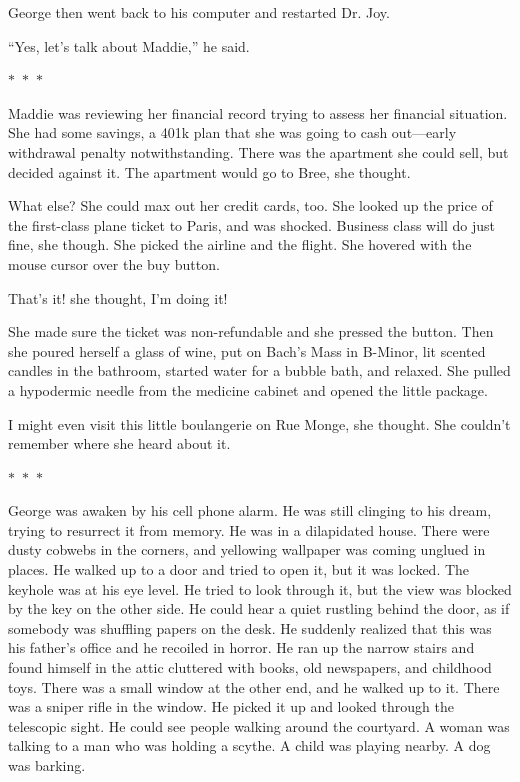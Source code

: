 \documentclass{memoir}
\newcommand{\starbreak}{%
\begin{center}
  $\ast$~$\ast$~$\ast$
\end{center}
}
\begin{document}
George then went back to his computer and restarted Dr. Joy.

``Yes, let's talk about Maddie,'' he said.

\starbreak

Maddie was reviewing her financial record trying to assess her financial situation. She had some savings, a 401k plan that she was going to cash out---early withdrawal penalty notwithstanding. There was the apartment she could sell, but decided against it. The apartment would go to Bree, she thought. 

What else? She could max out her credit cards, too. She looked up the price of the first-class plane ticket to Paris, and was shocked. Business class will do just fine, she though. She picked the airline and the flight. She hovered with the mouse cursor over the buy button. 

That's it! she thought, I'm doing it! 

She made sure the ticket was non-refundable and she pressed the button. Then she poured herself a glass of wine, put on Bach's Mass in B-Minor, lit scented candles in the bathroom, started water for a bubble bath, and relaxed. She pulled a hypodermic needle from the medicine cabinet and opened the little package.

I might even visit this little boulangerie on Rue Monge, she thought. She couldn't remember where she heard about it.

\starbreak

George was awaken by his cell phone alarm. He was still clinging to his dream, trying to resurrect it from memory. He was in a dilapidated house. There were dusty cobwebs in the corners, and yellowing wallpaper was coming unglued in places. He walked up to a door and tried to open it, but it was locked. The keyhole was at his eye level. He tried to look through it, but the view was blocked by the key on the other side. He could hear a quiet rustling behind the door, as if somebody was shuffling papers on the desk. He suddenly realized that this was his father's office and he recoiled in horror. He ran up the narrow stairs and found himself in the attic cluttered with books, old newspapers, and childhood toys. There was a small window at the other end, and he walked up to it. There was a sniper rifle in the window. He picked it up and looked through the telescopic sight. He could see people walking around the courtyard. A woman was talking to a man who was holding a scythe. A child was playing nearby. A dog was barking. 
\end{document}
